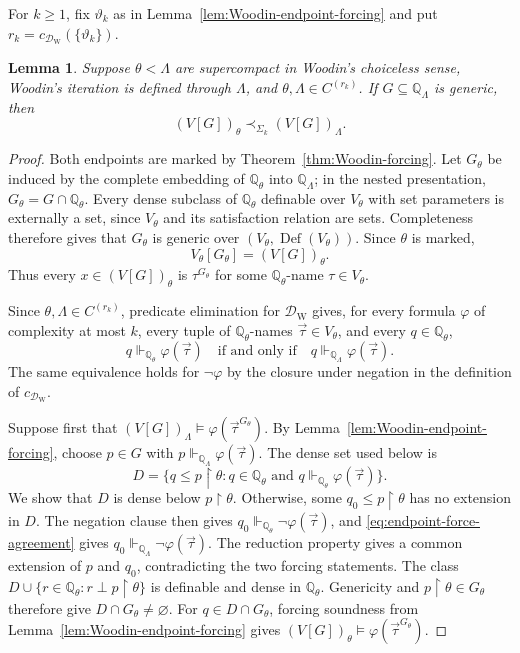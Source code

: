 \documentclass[11pt,a4paper]{amsart}
\newcommand{\Def}{\operatorname{Def}}
\newcommand{\restr}{\mathbin{\upharpoonright}}
\theoremstyle{plain}
\newtheorem{lemma}[theorem]{Lemma}
\theoremstyle{definition}
\theoremstyle{remark}
\begin{document}
{For $k\geq1$, fix $\vartheta_k$ as in Lemma~\ref{lem:Woodin-endpoint-forcing} and put $r_k=c_{\mathcal D_{\mathrm W}}(\{\vartheta_k\})$.}

\begin{lemma}\label{lem:finite-windows}
Suppose $\theta<\Lambda$ are supercompact in Woodin's choiceless sense, Woodin's iteration is defined through $\Lambda$, and $\theta,\Lambda\in C^{(r_k)}$.  If $G\subseteq\mathbb Q_\Lambda$ is generic, then
\[
(V[G])_\theta\prec_{\Sigma_k}(V[G])_\Lambda.
\]
\end{lemma}

\begin{proof}
  Both endpoints are marked by Theorem~\ref{thm:Woodin-forcing}.  Let $G_\theta$ be induced by the complete embedding of $\mathbb Q_\theta$ into $\mathbb Q_\Lambda$; in the nested presentation, $G_\theta=G\cap\mathbb Q_\theta$.  Every dense subclass of $\mathbb Q_\theta$ definable over $V_\theta$ with set parameters is externally a set, since $V_\theta$ and its satisfaction relation are sets.  Completeness therefore gives that $G_\theta$ is generic over $(V_\theta,\Def(V_\theta))$.  Since $\theta$ is marked,
  \[
  V_\theta[G_\theta]=(V[G])_\theta.
  \]
  Thus every $x\in(V[G])_\theta$ is $\tau^{G_\theta}$ for some $\mathbb Q_\theta$-name $\tau\in V_\theta$.

Since $\theta,\Lambda\in C^{(r_k)}$, predicate elimination for $\mathcal D_{\mathrm W}$ gives, for every formula $\varphi$ of complexity at most $k$, every tuple of $\mathbb Q_\theta$-names $\vec\tau\in V_\theta$, and every $q\in\mathbb Q_\theta$,
\begin{equation}\label{eq:endpoint-force-agreement}
q\Vdash_{\mathbb Q_\theta}\varphi(\vec\tau)
\quad\text{if and only if}\quad
q\Vdash_{\mathbb Q_\Lambda}\varphi(\vec\tau).
\end{equation}
The same equivalence holds for $\neg\varphi$ by the closure under negation in the definition of $c_{\mathcal D_{\mathrm W}}$.

Suppose first that $(V[G])_\Lambda\models\varphi(\vec\tau^{G_\theta})$.  By Lemma~\ref{lem:Woodin-endpoint-forcing}, choose $p\in G$ with $p\Vdash_{\mathbb Q_\Lambda}\varphi(\vec\tau)$.  The dense set used below is
\[
D=\{q\leq p\restr\theta:q\in\mathbb Q_\theta\text{ and }q\Vdash_{\mathbb Q_\theta}\varphi(\vec\tau)\}.
\]
We show that $D$ is dense below $p\restr\theta$.  Otherwise, some $q_0\leq p\restr\theta$ has no extension in $D$.  The negation clause then gives $q_0\Vdash_{\mathbb Q_\theta}\neg\varphi(\vec\tau)$, and \eqref{eq:endpoint-force-agreement} gives $q_0\Vdash_{\mathbb Q_\Lambda}\neg\varphi(\vec\tau)$.  The reduction property gives a common extension of $p$ and $q_0$, contradicting the two forcing statements.  The class $D\cup\{r\in\mathbb Q_\theta:r\perp p\restr\theta\}$ is definable and dense in $\mathbb Q_\theta$.  Genericity and $p\restr\theta\in G_\theta$ therefore give $D\cap G_\theta\ne\varnothing$.  For $q\in D\cap G_\theta$, forcing soundness from Lemma~\ref{lem:Woodin-endpoint-forcing} gives $(V[G])_\theta\models\varphi(\vec\tau^{G_\theta})$.


\end{proof}
\end{document}
